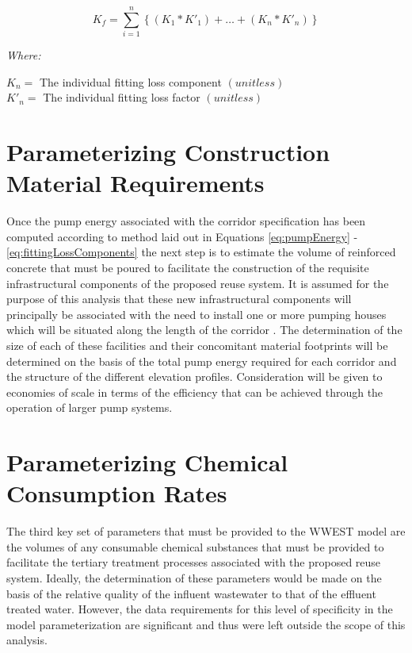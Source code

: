         \begin{equation}
            K_f = \sum\limits_{i=1}^n \left\{ (K_1 * K'_1) + \dots + (K_n * K'_n) \right\}
            \label{eq:fittingLossComponents}
        \end{equation}
    
       \noindent \textit{Where:} \hfill
       
       \begin{center}
           $K_n = $ The individual fitting loss component $(unitless)$ \\
           $K'_n = $ The individual fitting loss factor $(unitless)$ \\
       \end{center}
       
\section{Parameterizing Construction Material Requirements}

Once the pump energy associated with the corridor specification has been computed according to method laid out in Equations \ref{eq:pumpEnergy} - \ref{eq:fittingLossComponents} the next step is to estimate the volume of reinforced concrete that must be poured to facilitate the construction of the requisite infrastructural components of the proposed reuse system. It is assumed for the purpose of this analysis that these new infrastructural components will principally be associated with the need to install one or more pumping houses which will be situated along the length of the corridor \cite{Liu2003}. The determination of the size of each of these facilities and their concomitant material footprints will be determined on the basis of the total pump energy required for each corridor and the structure of the different elevation profiles. Consideration will be given to economies of scale in terms of the efficiency that can be achieved through the operation of larger pump systems.  
       
\section{Parameterizing Chemical Consumption Rates} 

The third key set of parameters that must be provided to the WWEST model are the volumes of any consumable chemical substances that must be provided to facilitate the tertiary treatment processes associated with the proposed reuse system. Ideally, the determination of these parameters would be made on the basis of the relative quality of the influent wastewater to that of the effluent treated water. However, the data requirements for this level of specificity in the model parameterization are significant and thus were left outside the scope of this analysis.


